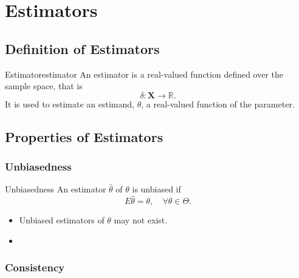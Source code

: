 \section{Estimators}

\subsection{Definition of Estimators}

\begin{definition}{Estimator}{estimator}
    An estimator is a real-valued function defined over the sample space, that is
    \begin{equation}
        \delta:\textbf{X}\rightarrow\mathbb{R}.
    \end{equation}
    It is used to estimate an estimand, $\theta$, a real-valued function of the parameter.
\end{definition}

\subsection{Properties of Estimators}

\subsubsection*{Unbiasedness}

\begin{definition}{Unbiasedness}{}
    An estimator $\hat{\theta}$ of $\theta$ is unbiased if
    \begin{equation}
        E\hat{\theta}=\theta,\quad\forall\theta\in\Theta.
    \end{equation}
\end{definition}

\begin{note}
    \begin{itemize}
        \item Unbiased estimators of $\theta$ may not exist.
        \item 
    \end{itemize}
\end{note}

\begin{example}
    
\end{example}

\subsubsection*{Consistency}


